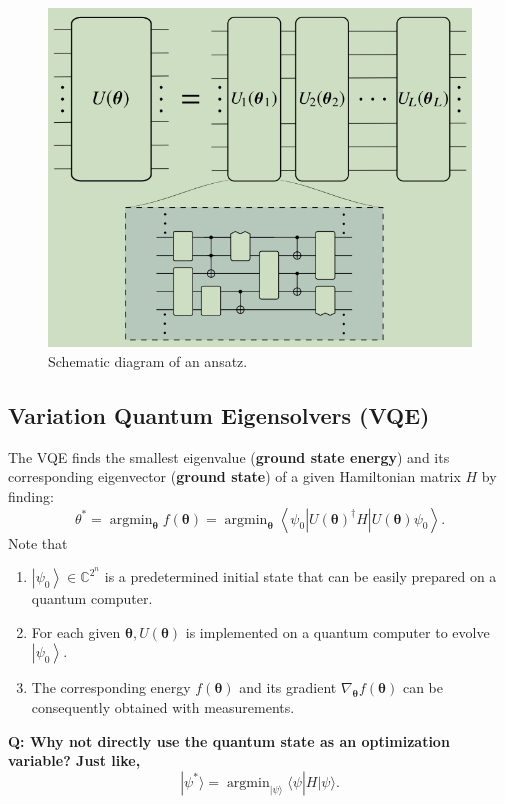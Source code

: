 \documentclass[
        11pt, %
	a4paper, %
]{LegrandOrangeBook}
\begin{document}
\begin{figure}
    \centering
    \includegraphics[width=0.75\linewidth]{Images/ansatz.png}
    \caption{Schematic diagram of an ansatz.}
    \label{fig:pqc}
\end{figure}

\subsection{Variation Quantum Eigensolvers (VQE) \cite{ding2023random}}

The VQE finds the smallest eigenvalue (\textbf{ground state energy}) and its corresponding eigenvector (\textbf{ground state}) of a given Hamiltonian matrix $H$ by finding:
\begin{equation}
    \theta^*=\operatorname{argmin}_{\boldsymbol{\theta}} f(\boldsymbol{\theta})=\operatorname{argmin}_{\boldsymbol{\theta}}\left\langle \psi_0|  U(\boldsymbol{\theta})^{\dagger}H| U(\boldsymbol{\theta}) \psi_0\right\rangle .
\end{equation}
Note that
\begin{enumerate}
    \item $\left|\psi_0\right\rangle \in \mathbb{C}^{2^n}$ is a predetermined initial state that can be easily prepared on a quantum computer.
    \item For each given $\boldsymbol{\theta}, U(\boldsymbol{\theta})$ is implemented on a quantum computer to evolve $\left|\psi_0\right\rangle$.
    \item The corresponding energy $f(\boldsymbol{\theta})$ and its gradient $\nabla_{\boldsymbol{\theta}} f(\boldsymbol{\theta})$ can be consequently obtained with measurements. 
\end{enumerate}

\textbf{Q: Why not directly use the quantum state as an optimization variable? Just like,}
\begin{equation}
    | \psi^*\rangle
=\operatorname{argmin}_{|\psi\rangle} \langle \psi| H | \psi\rangle.
\end{equation}
\end{document}
